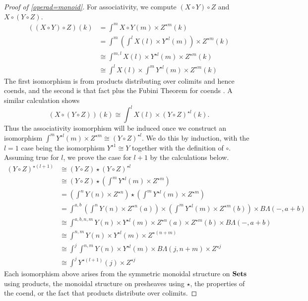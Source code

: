 \begin{proof}[Proof of \cref{operad=monoid}]
For associativity, we compute $(X \circ Y) \circ Z$ and $X \circ (Y \circ Z)$.
  \begin{align*}
    ((X \circ Y) \circ Z) (k) &= \int^{m} X \circ Y (m) \times Z^{\star m}(k) \\
    &= \int^{m} \left( \int^{l} X(l) \times Y^{\star l}(m) \right) \times Z^{\star m}(k) \\
    &\cong \int^{m,l} X(l) \times Y^{\star l}(m) \times Z^{\star m}(k) \\
    &\cong \int^{l} X(l) \times \int^{m} Y^{\star l}(m) \times Z^{\star m}(k)
  \end{align*}
The first isomorphism is from products distributing over colimits and hence coends, and the second is that fact plus the Fubini Theorem for coends \cite{maclane-catwork}. A similar calculation shows
  \[
    (X \circ (Y \circ Z))(k) \cong \int^{l} X(l) \times (Y \circ Z)^{\star l}(k).
  \]
Thus the associativity isomorphism will be induced once we construct an isomorphism $\int^{m} Y^{\star l}(m) \times Z^{\star m} \cong (Y \circ Z)^{\star l}$. We do this by induction, with the $l=1$ case being the isomorphism $Y^{\star 1} \cong Y$ together with the definition of $\circ.$  Assuming true for $l$, we prove the case for $l+1$ by the calculations below.
  \begin{align*}
    (Y \circ Z)^{\star (l+1)} &\cong (Y \circ Z) \star (Y \circ Z)^{\star l} \\
    &\cong (Y \circ Z) \star \left( \int^{m} Y^{\star l}(m) \times Z^{\star m} \right) \\
    &= \left( \int^{n} Y(n) \times Z^{\star n} \right) \star \left( \int^{m} Y^{\star l}(m) \times Z^{\star m} \right) \\
    &= \int^{a,b} \left( \int^{n} Y(n) \times Z^{\star n}(a) \right)  \times \left( \int^{m} Y^{\star l}(m) \times Z^{\star m}(b) \right) \times B\Lambda(-, a+b) \\
    &\cong \int^{a,b,n,m} Y(n) \times Y^{\star l}(m) \times Z^{\star n}(a) \times Z^{\star m}(b) \times  B\Lambda(-, a+b) \\
    &\cong \int^{n,m} Y(n) \times Y^{\star l}(m) \times Z^{\star (n+m)} \\
    &\cong \int^{j} \int^{n,m} Y(n) \times Y^{\star l}(m) \times B\Lambda(j, n+m) \times Z^{\star j} \\
    &\cong \int^{j} Y^{\star (l+1)}(j) \times Z^{\star j}
  \end{align*}
Each isomorphism above arises from the symmetric monoidal structure on $\mathbf{Sets}$ using products, the monoidal structure on presheaves using $\star$, the properties of the coend, or the fact that products distribute over colimits.


\end{proof}
